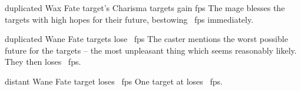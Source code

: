   {duplicated}%
  {Wax}%
  {Fate}%
  {target's Charisma}%
  { targets gain  \glspl{fp}}%
  {
    The mage blesses the targets with high hopes for their future, bestowing \showDam~\glspl{fp} immediately.
  }

  {duplicated}%
  {Wane}%
  {Fate}%
  {}%
  { targets lose \showDam~\glspl{fp}}%
  {
    The caster mentions the worst possible future for the targets -- the most unpleasant thing which seems reasonably likely.
    They then loses \showDam~\glspl{fp}.
  }

  {distant}%
  {Wane}%
  {Fate}%
  {}%
  {target loses \showDam~\glspl{fp}}%
  {
    One target at \spellRange{} loses \showDam~\glspl{fp}.
  }

